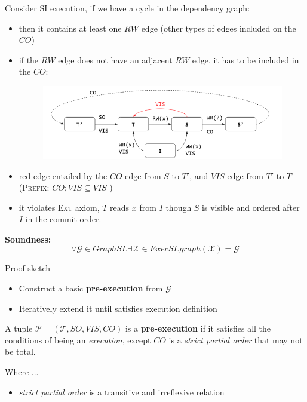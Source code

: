 \documentclass{beamer}
\begin{document}
\begin{frame}
Consider SI execution, if we have a cycle in the dependency graph:
\begin{itemize}
	\item then it contains at least one $RW$ edge (other types of edges included on the $CO$)
	\item if the $RW$ edge does not have an adjacent $RW$ edge, it has to be included in the $CO$:
		\begin{figure}
			\includegraphics[scale=0.3]{cycle}
		\end{figure}
	\item \alert{red} edge entailed by the $CO$ edge from $S$ to $T'$, and $VIS$ edge from $T'$ to $T$ (\textsc{Prefix}: $CO;VIS \subseteq VIS$ )
	\item it violates \textsc{Ext} axiom, $T$ reads $x$ from $I$ though $S$ is visible and ordered after $I$ in the commit order.
\end{itemize}
\end{frame}

\begin{frame}
	\begin{theorem}
		\textbf{Soundness:} $$ \forall \mathcal{G} \in GraphSI. \exists \mathcal{X} \in ExecSI. graph(\mathcal{X}) = \mathcal{G} $$ 	
	\end{theorem}
	\begin{block}{Proof sketch}
		\begin{itemize}
			\item Construct a basic \textbf{pre-execution} from $\mathcal{G}$
			\item Iteratively extend it until satisfies execution definition
		\end{itemize}		
	\end{block}
\end{frame}

\begin{frame}
	\begin{definition}
		A tuple $\mathcal{P} = (\mathcal{T}, SO, VIS, CO) $ is a \textbf{pre-execution} if it satisfies all the conditions of being an \emph{execution}, except $CO$ is a \textit{strict partial order} that may not be total.
	\end{definition}
	Where ...
	\begin{itemize}
		\item \textit{strict partial order} is a transitive and irreflexive relation
	\end{itemize}
\end{frame}
\end{document}
